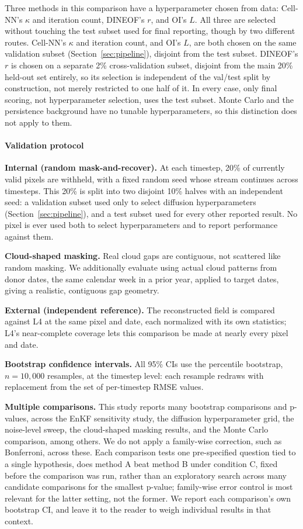 \documentclass[final,5p,times,twocolumn,authoryear]{elsarticle}
\begin{document}
Three methods in this comparison have a hyperparameter chosen from
data: Cell-NN's $\kappa$ and iteration count, DINEOF's $r$, and OI's
$L$. All three are selected without touching the test subset used
for final reporting, though by two different routes. Cell-NN's
$\kappa$ and iteration count, and OI's $L$, are both chosen on the
same validation subset (Section~\ref{sec:pipeline}), disjoint from
the test subset. DINEOF's $r$ is chosen on a separate 2\%
cross-validation subset, disjoint from the main 20\% held-out set
entirely, so its selection is independent of the val/test split by
construction, not merely restricted to one half of it. In every
case, only final scoring, not hyperparameter selection, uses the
test subset. Monte Carlo and the persistence background have no
tunable hyperparameters, so this distinction does not apply to them.

\paragraph{Validation protocol}

\textbf{Internal (random mask-and-recover).} At each timestep, 20\%
of currently valid pixels are withheld, with a fixed random seed
whose stream continues across timesteps. This 20\% is split into two
disjoint 10\% halves with an independent seed: a validation subset
used only to select diffusion hyperparameters
(Section~\ref{sec:pipeline}), and a test subset used for every other
reported result. No pixel is ever used both to select hyperparameters
and to report performance against them.

\textbf{Cloud-shaped masking.} Real cloud gaps are contiguous, not
scattered like random masking. We additionally evaluate using actual
cloud patterns from donor dates, the same calendar week in a prior
year, applied to target dates, giving a realistic, contiguous gap
geometry.

\textbf{External (independent reference).} The reconstructed field is
compared against L4 at the same pixel and date, each normalized with
its own statistics; L4's near-complete coverage lets this comparison
be made at nearly every pixel and date.

\textbf{Bootstrap confidence intervals.} All 95\% CIs use the
percentile bootstrap, $n=10{,}000$ resamples, at the timestep level:
each resample redraws with replacement from the set of per-timestep
RMSE values.

\textbf{Multiple comparisons.} This study reports many bootstrap
comparisons and p-values, across the EnKF sensitivity study, the
diffusion hyperparameter grid, the noise-level sweep, the
cloud-shaped masking results, and the Monte Carlo comparison, among
others. We do not apply a family-wise correction, such as
Bonferroni, across these. Each comparison tests one pre-specified
question tied to a single hypothesis, does method A beat method B
under condition C, fixed before the comparison was run, rather than
an exploratory search across many candidate comparisons for the
smallest p-value; family-wise error control is most relevant for the
latter setting, not the former. We report each comparison's own
bootstrap CI, and leave it to the reader to weigh individual results
in that context.
\end{document}
